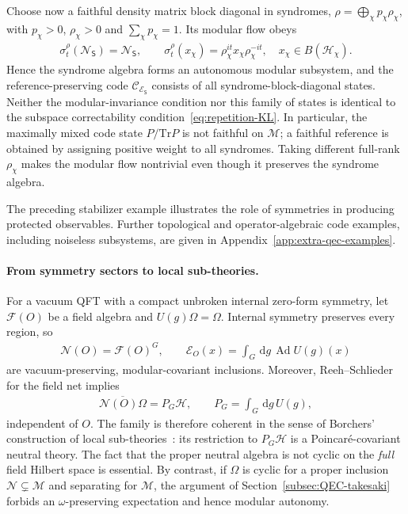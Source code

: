 \documentclass[a4paper,11pt]{article}
\theoremstyle{definition}
\newcommand{\dd}{\,\mathrm{d}}
\newcommand{\cH}{\mathcal{H}}
\newcommand{\Tr}{\text{Tr}}
\newcommand{\mN}{\mathcal{N}}
\newcommand{\mM}{\mathcal{M}}
\newcommand{\mE}{\mathcal{E}}
\begin{document}
Choose now a faithful density matrix block diagonal in syndromes,
$\rho=\bigoplus_\chi p_\chi\rho_\chi$, with
$p_\chi>0$, $\rho_\chi>0$ and $\sum_\chi p_\chi=1$. Its modular
flow obeys
\begin{align}
 \sigma_t^\rho(\mN_{\mathsf S})=\mN_{\mathsf S},
 \qquad
 \sigma_t^\rho(x_\chi)=\rho_\chi^{it}x_\chi\rho_\chi^{-it},
 \quad x_\chi\in B(\cH_\chi).
 \label{eq:stabilizer-modular-flow}
\end{align}
Hence the syndrome algebra forms an autonomous modular subsystem, and
the reference-preserving code $\mathcal C_{\mE_{\mathsf S}}$ consists of
all syndrome-block-diagonal states. Neither the modular-invariance
condition nor this family of states is identical to the subspace
correctability condition~\eqref{eq:repetition-KL}. In particular, the
maximally mixed code state $P/\Tr P$ is not faithful on $\mM$; a
faithful reference is obtained by assigning positive weight to all
syndromes. Taking different full-rank $\rho_\chi$ makes the modular
flow nontrivial even though it preserves the syndrome algebra.

The preceding stabilizer example illustrates the role of symmetries in producing protected observables. Further topological and operator-algebraic code examples, including noiseless subsystems, are given in Appendix~\ref{app:extra-qec-examples}.

\paragraph{From symmetry sectors to local sub-theories.}
For a vacuum QFT with a compact unbroken internal zero-form symmetry,
let $\mathcal F(O)$ be a field algebra and $U(g)\Omega=\Omega$. Internal
symmetry preserves every region, so
\begin{align}
 \mN(O)=\mathcal F(O)^G,\qquad
 \mE_O(x)=\int_G\dd g\,\operatorname{Ad}U(g)(x)
 \label{eq:internal-neutral-net}
\end{align}
are vacuum-preserving, modular-covariant inclusions. Moreover,
Reeh--Schlieder for the field net implies
\begin{align}
 \overline{\mN(O)\Omega}=P_G\cH,
 \qquad P_G=\int_G\dd g\,U(g),
 \label{eq:internal-coherent-projection}
\end{align}
independent of $O$. The family is therefore coherent in the sense of
Borchers' construction of local sub-theories~\cite{revolutionizing}:
its restriction to $P_G\cH$ is a Poincar\'e-covariant neutral theory.
The fact that the proper neutral algebra is not cyclic on the \emph{full}
field Hilbert space is essential. By contrast, if $\Omega$ is cyclic for
a proper inclusion $\mN\subsetneq\mM$ and separating for $\mM$, the
argument of Section~\ref{subsec:QEC-takesaki} forbids an
$\omega$-preserving expectation and hence modular autonomy.
\end{document}
